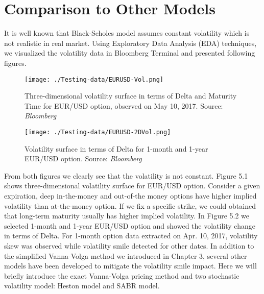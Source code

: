 \chapter{Comparison to Other Models}
It is well known that Black-Scholes model assumes constant volatility which is not realistic in real market. Using Exploratory Data Analysis (EDA) techniques, we visualized the volatility data in Bloomberg Terminal and presented following figures. 

\begin{figure}[htb]
	\centering
	\texttt{[image: ./Testing-data/EURUSD-Vol.png]} 
	\caption{Three-dimensional volatility surface in terms of Delta and Maturity Time for EUR/USD option, observed on May 10, 2017. Source: \textit{Bloomberg}}
	\label{fig:3dvol-label} %
\end{figure}
\begin{figure}[htb]
	\centering
	\texttt{[image: ./Testing-data/EURUSD-2DVol.png]} 
	\caption{Volatility surface in terms of Delta for 1-month and 1-year EUR/USD option. Source: \textit{Bloomberg}}
	\label{fig:2dvol-label} %
\end{figure}
\noindent
From both figures we clearly see that the volatility is not constant. Figure 5.1 shows three-dimensional volatility surface for EUR/USD option. Consider a given expiration, deep in-the-money and out-of-the money options have higher implied volatility than at-the-money option. If we fix a specific strike, we could obtained that long-term maturity usually has higher implied volatility.\newline\newline
In Figure 5.2 we selected 1-month and 1-year EUR/USD option and showed the volatility change in terms of Delta. For 1-month option  data extracted on Apr. 10, 2017, volatility skew was observed while volatility smile detected for other dates.
\newline\newline
In addition to the simplified Vanna-Volga method we introduced in Chapter 3, several other models have been developed to mitigate the volatility smile impact. Here we will briefly introduce the exact Vanna-Volga pricing method and two stochastic volatility model: Heston model and SABR model.

